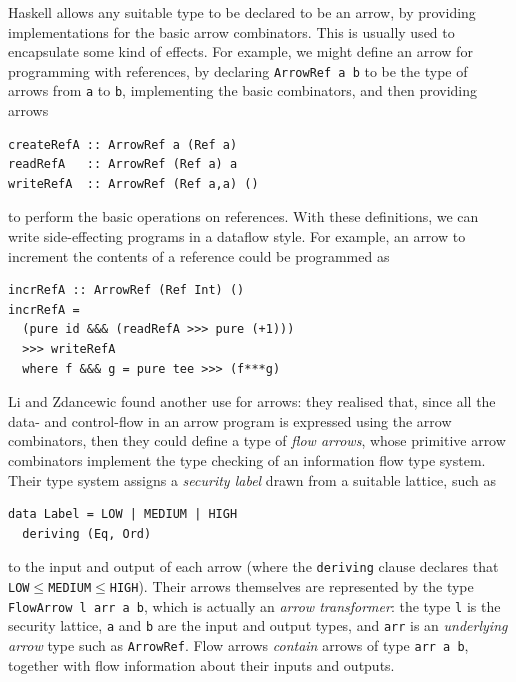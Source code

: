 \documentclass[times, 10pt,twocolumn]{article}
\begin{document}
Haskell allows any suitable type to be declared to be an arrow, by
providing implementations for the basic arrow combinators. This is
usually used to encapsulate some kind of effects. For example, we
might define an arrow for programming with references, by declaring
\verb!ArrowRef a b! to be the type of arrows from \verb!a!  to
\verb!b!, implementing the basic combinators, and then providing
arrows
\begin{Verbatim}[fontsize=\footnotesize]
createRefA :: ArrowRef a (Ref a)
readRefA   :: ArrowRef (Ref a) a
writeRefA  :: ArrowRef (Ref a,a) ()
\end{Verbatim}
to perform the basic operations on references. With these definitions,
we can write side-effecting programs in a dataflow style. For example,
an arrow to increment the contents of a reference could be programmed
as
\begin{Verbatim}[fontsize=\footnotesize]
incrRefA :: ArrowRef (Ref Int) ()
incrRefA = 
  (pure id &&& (readRefA >>> pure (+1)))
  >>> writeRefA
  where f &&& g = pure tee >>> (f***g)
\end{Verbatim}

Li and Zdancewic found another use for arrows: they realised that,
since all the data- and control-flow in an arrow program is expressed
using the arrow combinators, then they could define a type of {\em
  flow arrows}, whose primitive arrow combinators implement the type
checking of an information flow type system.  Their type system
assigns a {\em security label} drawn from a suitable lattice, such as
\begin{Verbatim}[fontsize=\footnotesize]
data Label = LOW | MEDIUM | HIGH
  deriving (Eq, Ord)
\end{Verbatim}
to the input and output of each arrow (where the \verb!deriving!
clause declares that \verb!LOW!$\leq$\verb!MEDIUM!$\leq$\verb!HIGH!).
Their arrows themselves are represented by the type 
%
\verb!FlowArrow l arr a b!, 
%
which is actually an {\em arrow transformer}: the type \verb!l! is the
security lattice, \verb!a! and \verb!b! are the input and output
types, and \verb!arr! is an {\em underlying arrow} type such as
\verb!ArrowRef!. Flow arrows {\em contain} arrows of type 
%
\verb!arr a b!, together with flow information about their inputs and
outputs.
\end{document}
